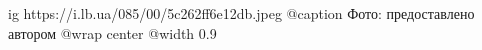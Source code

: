  
 
 
 
 

\ifcmt
  ig https://i.lb.ua/085/00/5c262ff6e12db.jpeg
	@caption Фото: предоставлено автором
  @wrap center
  @width 0.9
\fi
